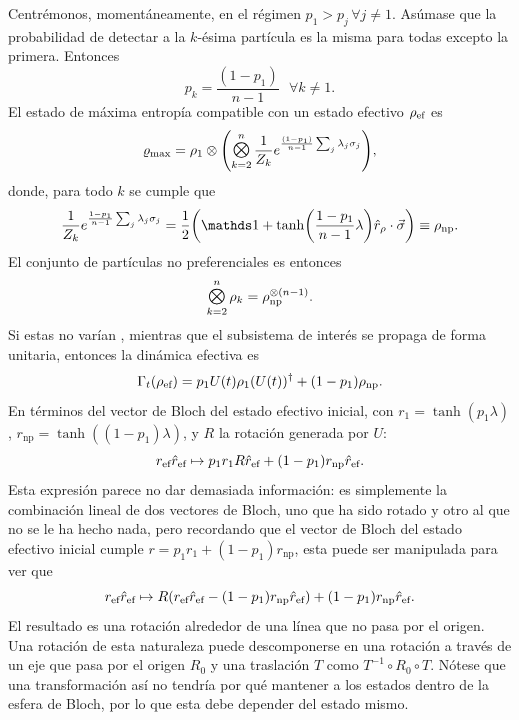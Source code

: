 Centrémonos, momentáneamente, en el régimen $p_{1}>p_{j}\,\forall j\neq 1$. Asúmase que la probabilidad de detectar a la $k$-ésima partícula es la misma para todas excepto la primera. Entonces
\begin{equation}
    p_{k}=\frac{(1-p_{1})}{n-1}\text{ }\forall k\neq 1.\nonumber
\end{equation}
El estado de máxima entropía compatible con un estado efectivo $\rho_{\text{ef}}$ es
\begin{equation}
    \varrho_{\max}=\rho_{1}\otimes\qty(\Motimes_{k=2}^{n}\frac{1}{Z_{k}}e^{\frac{(1-p_{1})}{n-1}\sum_{j}\lambda_{j}\pauli{j}}),\nonumber
\end{equation}
donde, para todo $k$ se cumple que
\begin{equation}
    \frac{1}{Z_{k}}e^{\frac{1-p_{1}}{n-1}\sum_{j}\lambda_{j}\pauli{j}}=\frac{1}{2}\qty(\Id+\tanh(\frac{1-p_{1}}{n-1}\lambda)\hat{r}_{\rho}\cdot\vec{\sigma})\equiv \rho_{\text{np}}.\nonumber
\end{equation}
 El  conjunto de partículas no preferenciales es entonces
\begin{equation}
    \Motimes_{k=2}^{n}\rho_{k}=\rho_{\text{np}}^{\otimes(n-1)}\nonumber.
\end{equation}
Si estas no varían , mientras que el subsistema de interés se propaga de forma unitaria, entonces la dinámica efectiva es
\begin{equation}
    \Gamma_{t}(\rho_{\text{ef}})=p_{1}U(t)\rho_{1}(U(t))^{\dag}+(1-p_{1})\rho_{\text{np}}.\nonumber
\end{equation}
En términos del vector de Bloch del estado efectivo inicial, con $r_{1}=\tanh(p_{1}\lambda)$, $r_{\text{np}}=\tanh((1-p_{1})\lambda)$, y $R$ la rotación generada por $U$:
\begin{equation}
    r_{\text{ef}}\hat{r}_{\text{ef}}\mapsto p_{1}r_{1}R\hat{r}_{\text{ef}}+(1-p_{1})r_{\text{np}}\hat{r}_{\text{ef}}.\nonumber
\end{equation}
Esta expresión parece no dar demasiada información: es simplemente la combinación lineal de dos vectores de Bloch, uno que ha sido rotado y otro al que no se le ha hecho nada, pero recordando que el vector de Bloch del estado efectivo inicial cumple $r=p_{1}r_{1}+(1-p_{1})r_{\text{np}}$, esta puede ser manipulada para ver que
\begin{equation}
    r_{\text{ef}}\hat{r}_{\text{ef}}\mapsto R(r_{\text{ef}}\hat{r}_{\text{ef}}-(1-p_{1})r_{\text{np}}\hat{r}_{\text{ef}})+(1-p_{1})r_{\text{np}}\hat{r}_{\text{ef}}.\nonumber
\end{equation}
El resultado es una rotación alrededor de una línea que no pasa por el origen. Una rotación de esta naturaleza puede descomponerse en una rotación a través de un eje que pasa por el origen $R_{0}$ y una traslación $T$ como $T^{-1}\circ R_{0}\circ T$. Nótese que una transformación así no tendría por qué mantener a los estados dentro de la esfera de Bloch, por lo que esta debe depender del estado mismo. 

